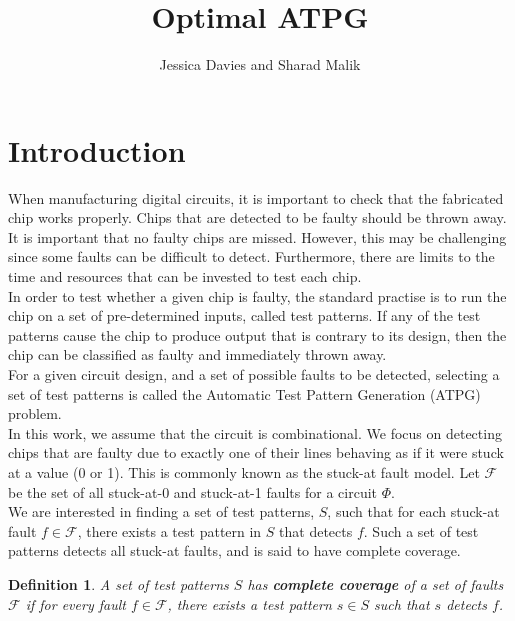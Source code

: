 \documentclass{article}
\newcommand{\F}{\mathcal{F}}
\newtheorem{definition}{Definition}
\begin{document}
\title{Optimal ATPG}
\author{Jessica Davies and Sharad Malik}
\maketitle

\section{Introduction}

When manufacturing digital circuits, it is important to check that the fabricated chip works properly. Chips that are detected to be faulty should be thrown away. It is important that no faulty chips are missed. However, this may be challenging since some faults can be difficult to detect. Furthermore, there are limits to the time and resources that can be invested to test each chip.\\

In order to test whether a given chip is faulty, the standard practise is to run the chip on a set of pre-determined inputs, called test patterns. If any of the test patterns cause the chip to produce output that is contrary to its design, then the chip can be classified as faulty and immediately thrown away.  \\ 

For a given circuit design, and a set of possible faults to be detected, selecting a set of test patterns is called the Automatic Test Pattern Generation (ATPG) problem.\\

In this work, we assume that the circuit is combinational. We focus on detecting chips that are faulty due to exactly one of their lines behaving as if it were stuck at a value (0 or 1). This is commonly known as the stuck-at fault model. Let $\F$ be the set of all stuck-at-0 and stuck-at-1 faults for a circuit $\Phi$.\\

We are interested in finding a set of test patterns, $S$, such that for each stuck-at fault $f \in \F$, there exists a test pattern in $S$ that detects $f$. Such a set of test patterns detects all stuck-at faults, and is said to have complete coverage.\\

\begin{definition}
A set of test patterns $S$ has \textbf{complete coverage} of a set of faults $\F$ if for every fault $f \in \F$, there exists a test pattern $s \in S$ such that $s$ detects $f$.
\end{definition}
\end{document}
